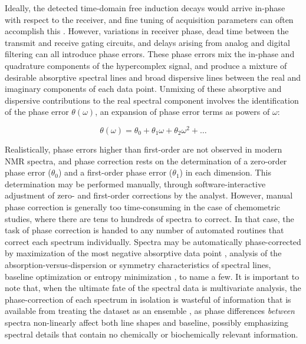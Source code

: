 \begin{doublespace}
Ideally, the detected time-domain free induction decays would arrive in-phase
with respect to the receiver, and fine tuning of acquisition parameters can
often accomplish this \cite{chylla:jbnmr1998}.
However, variations in receiver phase, dead time
between the transmit and receive gating circuits, and delays arising from
analog and digital filtering can all introduce phase errors. These phase
errors mix the in-phase and quadrature components of the hypercomplex signal,
and produce a mixture of desirable absorptive spectral lines and broad
dispersive lines between the real and imaginary components of each data point.
Unmixing of these absorptive and dispersive contributions to the real spectral
component involves the identification of the phase error $\theta(\omega)$, an
expansion of phase error terms as powers of $\omega$:

\begin{equation}
\theta(\omega) = \theta_0 + \theta_1 \omega + \theta_2 \omega^2 + \dots
\end{equation}

Realistically, phase errors higher than first-order are not observed in modern
NMR spectra, and phase correction rests on the determination of a zero-order
phase error ($\theta_0$) and a first-order phase error ($\theta_1$) in each
dimension. This determination may be performed manually, through
software-interactive adjustment of zero- and first-order corrections by the
analyst. However, manual phase correction is generally too time-consuming in
the case of chemometric studies, where there are tens to hundreds of spectra
to correct. In that case, the task of phase correction is handed to any number
of automated routines that correct each spectrum individually. Spectra may be
automatically phase-corrected by maximization of the most negative absorptive
data point \cite{siegel:aca1981}, analysis of the absorption-versus-dispersion
\cite{craig:jmr1988} or symmetry \cite{heuer:jmr1991} characteristics of
spectral lines, baseline optimization \cite{brown:jmr1989} or entropy
minimization \cite{chen:jmr2002}, to name a few. It is important to note that,
when the ultimate fate of the spectral data is multivariate analysis, the
phase-correction of each spectrum in isolation is wasteful of information that
is available from treating the dataset as an ensemble \cite{worley:cils2014},
as phase differences {\it between} spectra non-linearly affect both line shapes
and baseline, possibly emphasizing spectral details that contain no
chemically or biochemically relevant information.
\end{doublespace}

